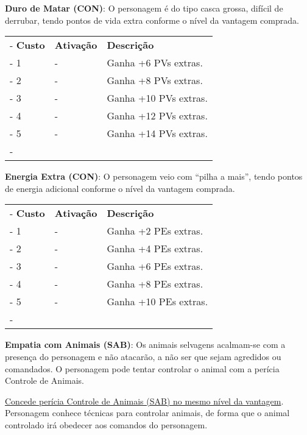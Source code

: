 \begin{small}
\textbf{Duro de Matar (CON)}: O personagem é do tipo casca grossa, difícil de derrubar, tendo pontos de vida extra conforme o nível da vantagem comprada.

	\begin{tabu}{|X[c]|X[c]|X[3]|} \tabucline-
		\textbf{Custo} 	& \textbf{Ativação}	&	\textbf{Descrição} \\ \tabucline-
		1	& 	-		& Ganha +6 PVs extras. \\ \tabucline-
		2	& 	-		& Ganha +8 PVs extras. \\ \tabucline-
		3	& 	-		& Ganha +10 PVs extras. \\ \tabucline-
		4	& 	-		& Ganha +12 PVs extras. \\ \tabucline-
		5	& 	-		& Ganha +14 PVs extras. \\ \tabucline-
	\end{tabu}


\textbf{Energia Extra (CON)}: O personagem veio com ``pilha a mais'', tendo pontos de energia adicional conforme o nível da vantagem comprada.

	\begin{tabu}{|X[c]|X[c]|X[3]|} \tabucline-
		\textbf{Custo} 	& \textbf{Ativação}	&	\textbf{Descrição} \\ \tabucline-
		1	& 	-		& Ganha +2 PEs extras. \\ \tabucline-
		2	& 	-		& Ganha +4 PEs extras. \\ \tabucline-
		3	& 	-		& Ganha +6 PEs extras. \\ \tabucline-
		4	& 	-		& Ganha +8 PEs extras. \\ \tabucline-
		5	& 	-		& Ganha +10 PEs extras. \\ \tabucline-
	\end{tabu}


\textbf{Empatia com Animais (SAB)}: Os animais selvagens acalmam-se com a presença do personagem e não atacarão, a não ser que sejam agredidos ou comandados. O personagem pode tentar controlar o animal com a perícia Controle de Animais.

\underline{Concede perícia Controle de Animais (SAB) no mesmo nível da vantagem}. Personagem conhece técnicas para controlar animais, de forma que o animal controlado irá obedecer aos comandos do personagem.


\end{small}
